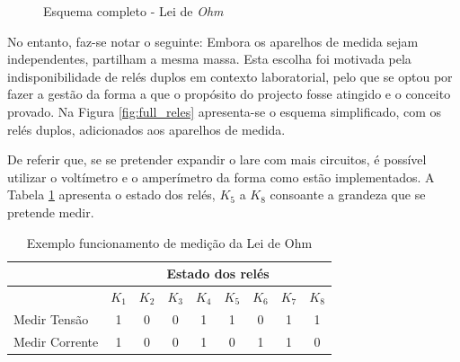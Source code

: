\begin{figure}[hbtp]
	\centering%
		\centering
		\qquad
		\caption{Esquema completo - Lei de \textit{Ohm}}%
		\label{fig:}%
	\end{figure}

No entanto, faz-se notar o seguinte: Embora os aparelhos de medida sejam independentes, partilham a mesma massa. Esta escolha foi motivada pela indisponibilidade de relés duplos em contexto laboratorial, pelo que se optou por fazer a gestão da forma a que o propósito do projecto fosse atingido e o conceito provado. Na Figura \ref{fig:full_reles} apresenta-se o esquema simplificado, com os relés duplos, adicionados aos aparelhos de medida. 

De referir que, se se pretender expandir o \acrshort{lare} com mais circuitos, é possível utilizar o voltímetro e o amperímetro da forma como estão implementados. A Tabela \ref{Table:exemplomedicaoohm} apresenta o estado dos relés, $K_{5}$ a $K_{8}$ consoante a grandeza que se pretende medir.

\begin{table}[htb]
	\centering
	\caption{Exemplo funcionamento de medição da Lei de Ohm} 
	
	\label{Table:exemplomedicaoohm}
	\begin{tabular}{lcccccccc}
		\toprule
		               & \multicolumn{8}{c}{Estado dos relés}                                                                       \\
		\midrule
		               & $K_{1}$                              & $K_{2}$ & $K_{3}$ & $K_{4}$ & $K_{5}$ & $K_{6}$ & $K_{7}$ & $K_{8}$ \\
		\midrule
		Medir Tensão   & 1                                    & 0       & 0       & 1       & 1       & 0       & 1       & 1       \\
		\midrule
		Medir Corrente & 1                                    & 0       & 0       & 1       & 0       & 1       & 1       & 0       \\
		\bottomrule
	\end{tabular}
\end{table}

